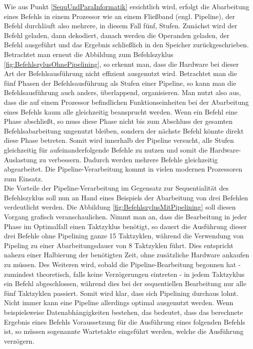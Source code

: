 				Wie aus Punkt \ref{SequUndParaInformatik} ersichtlich wird, erfolgt die Abarbeitung eines Befehls in einem Prozessor wie an einem Fließband (engl. Pipeline), der Befehl durchläuft also mehrere, in diesem Fall fünf, Stufen. Zunächst wird der Befehl geladen, dann dekodiert, danach werden die Operanden geladen, der Befehl ausgeführt und das Ergebnis schließlich in den Speicher zurückgeschrieben.\\
				Betrachtet man erneut die Abbildung zum Befehlszyklus \ref{fig:BefehlszylusOhnePipelining}, so erkennt man, dass die Hardware bei dieser Art der Befehlsausführung nicht effizient ausgenutzt wird. Betrachtet man die fünf Phasen der Befehlsausführung als Stufen einer Pipeline, so kann man die Befehlsausführung auch anders, überlappend, organisieren. Man nutzt also aus, dass die auf einem Prozessor befindlichen Funktionseinheiten bei der Abarbeitung eines Befehls kaum alle gleichzeitig beansprucht werden. Wenn ein Befehl eine Phase abschließt, so muss diese Phase nicht bis zum Abschluss der gesamten Befehlsabarbeitung ungenutzt bleiben, sondern der nächste Befehl könnte direkt diese Phase betreten. Somit wird innerhalb der Pipeline versucht, alle Stufen gleichzeitig für aufeinanderfolgende Befehle zu nutzen und somit die Hardware-Auslastung zu verbessern. Dadurch werden mehrere Befehle gleichzeitig abgearbeitet. Die Pipeline-Verarbeitung kommt in vielen modernen Prozessoren zum Einsatz.\\
				Die Vorteile der Pipeline-Verarbeitung im Gegensatz zur Sequentialität des Befehlszyklus soll nun an Hand eines Beispiels der Abarbeitung von drei Befehlen verdeutlicht werden.
				Die Abbildung \ref{fig:BefehlszylusMitPipelining} soll diesen Vorgang grafisch veranschaulichen. Nimmt man an, dass die Bearbeitung in jeder Phase im Optimalfall einen Taktzyklus benötigt, so dauert die Ausführung dieser drei Befehle ohne Pipelining ganze 15 Taktzyklen, während die Verwendung von Pipeling zu einer Abarbeitungsdauer von 8 Taktzyklen führt. Dies entspricht nahezu einer Halbierung der benötigten Zeit, ohne zusätzliche Hardware ankaufen zu müssen. Des Weiteren wird, sobald die Pipeline-Bearbeitung begonnen hat - zumindest theoretisch, falls keine Verzögerungen eintreten - in jedem Taktzyklus ein Befehl abgeschlossen, während dies bei der sequentiellen Bearbeitung nur alle fünf Taktzyklen passiert. Somit wird klar, dass sich Pipelining durchaus lohnt.\\
				Nicht immer kann eine Pipeline allerdings optimal ausgenutzt werden. Wenn beispielsweise Datenabhängigkeiten bestehen, das bedeutet, dass das berechnete Ergebnis eines Befehls Voraussetzung für die Ausführung eines folgenden Befehls ist, so müssen sogenannte Wartetakte eingeführt werden, welche die Ausführung verzögern. \cite{AufbauFunktionsweiseMikroprozessoren}
				
